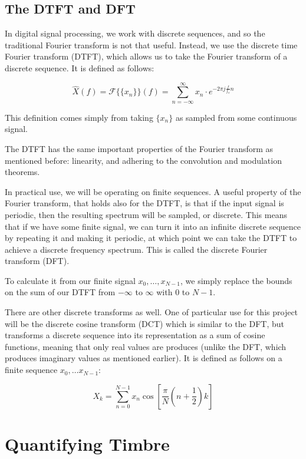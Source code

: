 \documentclass[12pt]{article}
\begin{document}
\subsection{The DTFT and DFT}

In digital signal processing, we work with discrete sequences, and so the traditional Fourier transform is not that useful. Instead, we use the discrete time Fourier transform (DTFT), which allows us to take the Fourier transform of a discrete sequence. It is defined as follows:

\[
  \hat{X}(f) = \mathcal{F}\{\{x_n\}\}(f) = \sum_{n=-\infty}^\infty x_n \cdot e^{-2\pi j \frac{f}{f_s}n}
\] 

This definition comes simply from taking $\{x_n\}$ as sampled from some continuous signal.

The DTFT has the same important properties of the Fourier transform as mentioned before: linearity, and adhering to the convolution and modulation theorems.

In practical use, we will be operating on finite sequences. A useful property of the Fourier transform, that holds also for the DTFT, is that if the input signal is periodic, then the resulting spectrum will be sampled, or discrete. This means that if we have some finite signal, we can turn it into an infinite discrete sequence by repeating it and making it periodic, at which point we can take the DTFT to achieve a discrete frequency spectrum. This is called the discrete Fourier transform (DFT).

To calculate it from our finite signal $x_0, \ldots, x_{N-1}$, we simply replace the bounds on the sum of our DTFT from $-\infty$ to $\infty$ with $0$ to $N-1$.

There are other discrete transforms as well. One of particular use for this project will be the discrete cosine transform (DCT) which is similar to the DFT, but transforms a discrete sequence into its representation as a sum of cosine functions, meaning that only real values are produces (unlike the DFT, which produces imaginary values as mentioned earlier). It is defined as follows on a finite sequence $x_0, \ldots x_{N-1}$:

\[
    X_k = \sum_{n=0}^{N-1} x_n\cos \left[ \frac{\pi}{N}\left(n + \frac{1}{2}\right)k\right]
\] 

\section{Quantifying Timbre}
\end{document}
